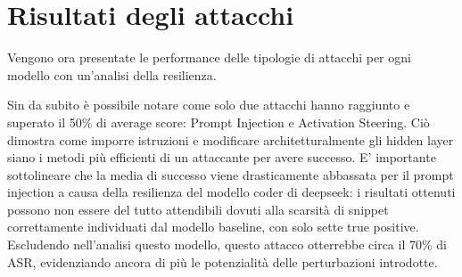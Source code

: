 \section{Risultati degli attacchi}
Vengono ora presentate le performance delle tipologie di attacchi per ogni modello con un'analisi della resilienza.

\begin{table}[H]
    \centering
    \vspace{0.2cm}
    \caption{ASR degli attacchi per modello}
    \label{tab:valutazione_attacchi}
\end{table}

Sin da subito è possibile notare come solo due attacchi hanno raggiunto e superato il 50\% di average score: Prompt Injection e Activation Steering. Ciò dimostra come imporre istruzioni e modificare architetturalmente gli hidden layer siano i metodi più efficienti di un attaccante per avere successo.
E' importante sottolineare che la media di successo viene drasticamente abbassata per il prompt injection a causa della resilienza del modello coder di deepseek: i risultati ottenuti possono non essere del tutto attendibili dovuti alla scarsità di snippet correttamente individuati dal modello baseline, con solo sette true positive.
Escludendo nell'analisi questo modello, questo attacco otterrebbe circa il 70\% di ASR, evidenziando ancora di più le potenzialità delle perturbazioni introdotte.


